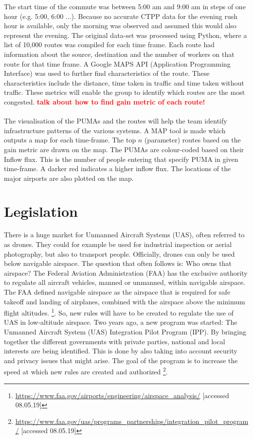 The start time of the commute was between 5:00 am and 9:00 am in steps of one hour (e.g. 5:00, 6:00 ...). Because no accurate CTPP data for the evening rush hour is available, only the morning was observed and assumed this would also represent the evening. The original data-set was processed using Python, where a list of 10,000 routes was compiled for each time frame. Each route had information about the source, destination and the number of workers on that route for that time frame. A Google MAPS API (Application Programming Interface) was used to further find characteristics of the route. These characteristics include the distance, time taken in traffic and time taken without traffic. These metrics will enable the group to identify which routes are the most congested. \textbf{\textcolor{red}{talk about how to find gain metric of each route!}}\\\\
The visualisation of the PUMAs and the routes will help the team identify infrastructure patterns of the various systems. A MAP tool is made which outputs a map for each time-frame. The top $n$ (parameter) routes based on the gain metric are drawn on the map. The PUMAs are colour-coded based on their Inflow flux. This is the number of people entering that specify PUMA in given time-frame. A darker red indicates a higher inflow flux. The locations of the major airports are also plotted on the map. 

\section{Legislation}
\label{legislation}
There is a huge market for Unmanned Aircraft Systems (UAS), often referred to as drones. They could for example be used for industrial inspection or aerial photography, but also to transport people. Officially, drones can only be used below navigable airspace. The question that often follows is: Who owns that airspace? The Federal Aviation Administration (FAA) has the exclusive authority to regulate all aircraft vehicles, manned or unmanned, within navigable airspace. The FAA defined navigable airspace as the airspace that is required for safe takeoff and landing of airplanes, combined with the airspace above the minimum flight altitudes. \footnote{\url{https://www.faa.gov/airports/engineering/airspace_analysis/} [accessed 08.05.19]}. So, new rules will have to be created to regulate the use of UAS in low-altitude airspace. Two years ago, a new program was started: The Unmanned Aircraft System (UAS) Integration Pilot Program (IPP). By bringing together the different governments with private parties, national and local interests are being identified. This is done by also taking into account security and privacy issues that might arise. The goal of the program is to increase the speed at which new rules are created and authorized \footnote{\url{https://www.faa.gov/uas/programs_partnerships/integration_pilot_program/} [accessed 08.05.19]}.

